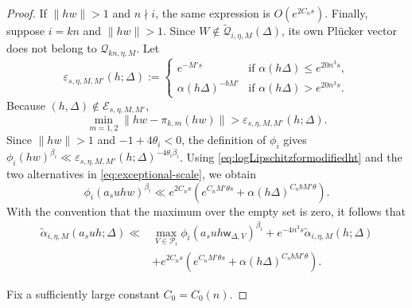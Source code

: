 \documentclass[10pt,a4paper]{amsart}
\begin{document}
\begin{proof}
If $\|hw\|>1$ and $n\nmid i$, the same expression is
$O(e^{2C_ns})$. Finally, suppose $i=kn$ and $\|hw\|>1$. Since
$W\notin\widetilde{\mathscr Q}_{i,\eta,M}(\Delta)$, its own Pl\"ucker vector does not
belong to $\mathscr Q_{kn,\eta,M}$. Let
\begin{equation}\label{eq:exceptional-scale}
    \varepsilon_{s,\eta,M,M'}(h;\Delta)
:=
\begin{cases}
e^{-M's}
&\text{if } \alpha(h\Delta)
\le e^{20n^3s},\\ 
\alpha(h\Delta)^{-bM'}
&\text{if }\alpha(h\Delta)
>e^{20n^3s}.\end{cases}
\end{equation}  Because
$(h,\Delta)\notin\mathcal E_{s,\eta,M,M'}$,
$$
\min_{m=1,2}\|hw-\pi_{k,m}(hw)\|
>\varepsilon_{s,\eta,M,M'}(h;\Delta).
$$
Since $\|hw\|>1$ and $-1+4\theta_i<0$, the definition of $\phi_i$ gives
$\phi_i(hw)^{\beta_i}\ll
\varepsilon_{s,\eta,M,M'}(h;\Delta)^{-4\theta_i\beta_i}$.
Using \eqref{eq:logLipschitzformodifiedht} and the two alternatives in
\eqref{eq:exceptional-scale},
we obtain
\begin{equation}\label{eq:outside-P-error}
\phi_i(a_suhw)^{\beta_i}
\ll
e^{2C_ns}
\left(
 e^{C_nM'\theta s}
 +\alpha(h\Delta)^{C_nbM'\theta}
\right).
\end{equation}
With the convention that the maximum over the empty set is zero, it follows that
\begin{equation}\label{eq:competitor-reduction}
\begin{aligned}
\widetilde\alpha_{i,\eta,M}(a_suh;\Delta)
\ll{}&
\max_{V\in\mathcal P_i}
\phi_i(a_suh\mathsf w_{\Delta,V})^{\beta_i}
+e^{-4n^3s}\widetilde\alpha_{i,\eta,M}(h;\Delta)\\
&+e^{2C_ns}
\left(e^{C_nM'\theta s}+\alpha(h\Delta)^{C_nbM'\theta}\right).
\end{aligned}
\end{equation}

Fix a sufficiently large constant $C_0=C_0(n)$. 


\end{proof}
\end{document}
